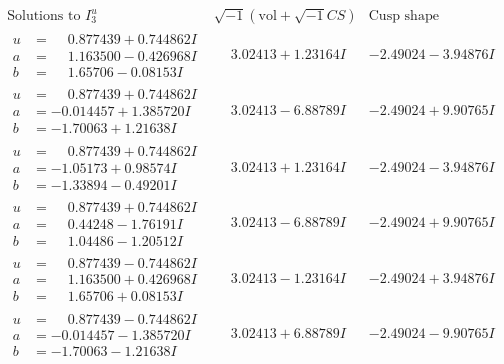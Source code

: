 \documentclass[1p]{elsarticle_modified}
\theoremstyle{definition}
\newcommand{\I}{\sqrt{-1}}
\begin{document}
$$\begin{array}{c|c|c}  
\text{Solutions to }I^u_{3}& \I (\text{vol} + \sqrt{-1}CS) & \text{Cusp shape}\\
 \hline 
\begin{aligned}
u &= \phantom{-}0.877439 + 0.744862 I \\
a &= \phantom{-}1.163500 - 0.426968 I \\
b &= \phantom{-}1.65706 - 0.08153 I\end{aligned}
 & \phantom{-}3.02413 + 1.23164 I & -2.49024 - 3.94876 I \\ \hline\begin{aligned}
u &= \phantom{-}0.877439 + 0.744862 I \\
a &= -0.014457 + 1.385720 I \\
b &= -1.70063 + 1.21638 I\end{aligned}
 & \phantom{-}3.02413 - 6.88789 I & -2.49024 + 9.90765 I \\ \hline\begin{aligned}
u &= \phantom{-}0.877439 + 0.744862 I \\
a &= -1.05173 + 0.98574 I \\
b &= -1.33894 - 0.49201 I\end{aligned}
 & \phantom{-}3.02413 + 1.23164 I & -2.49024 - 3.94876 I \\ \hline\begin{aligned}
u &= \phantom{-}0.877439 + 0.744862 I \\
a &= \phantom{-}0.44248 - 1.76191 I \\
b &= \phantom{-}1.04486 - 1.20512 I\end{aligned}
 & \phantom{-}3.02413 - 6.88789 I & -2.49024 + 9.90765 I \\ \hline\begin{aligned}
u &= \phantom{-}0.877439 - 0.744862 I \\
a &= \phantom{-}1.163500 + 0.426968 I \\
b &= \phantom{-}1.65706 + 0.08153 I\end{aligned}
 & \phantom{-}3.02413 - 1.23164 I & -2.49024 + 3.94876 I \\ \hline\begin{aligned}
u &= \phantom{-}0.877439 - 0.744862 I \\
a &= -0.014457 - 1.385720 I \\
b &= -1.70063 - 1.21638 I\end{aligned}
 & \phantom{-}3.02413 + 6.88789 I & -2.49024 - 9.90765 I \\ \hline\begin{aligned}

\end{aligned}
\end{array}$$
\end{document}
